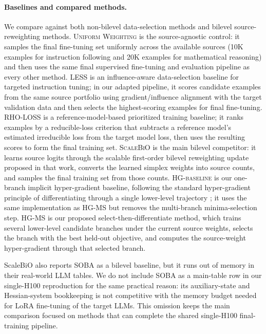 \documentclass{article}
\theoremstyle{normaltheorem}
\begin{document}
\paragraph{Baselines and compared methods.}
We compare against both non-bilevel data-selection methods and bilevel source-reweighting methods. \textsc{Uniform Weighting} is the source-agnostic control: it samples the final fine-tuning set uniformly across the available sources (10K examples for instruction following and 20K examples for mathematical reasoning) and then uses the same final supervised fine-tuning and evaluation pipeline as every other method. \textsc{LESS} \citep{xia2024less} is an influence-aware data-selection baseline for targeted instruction tuning; in our adapted pipeline, it scores candidate examples from the same source portfolio using gradient/influence alignment with the target validation data and then selects the highest-scoring examples for final fine-tuning. \textsc{RHO-LOSS} \citep{mindermann2022prioritized} is a reference-model-based prioritized training baseline; it ranks examples by a reducible-loss criterion that subtracts a reference model's estimated irreducible loss from the target model loss, then uses the resulting scores to form the final training set. \textsc{ScaleBiO} \citep{pan2025scalebio} is the main bilevel competitor: it learns source logits through the scalable first-order bilevel reweighting update proposed in that work, converts the learned simplex weights into source counts, and samples the final training set from those counts. \textsc{HG-baseline} is our one-branch implicit hyper-gradient baseline, following the standard hyper-gradient principle of differentiating through a single lower-level trajectory \citep{lorraine2020optimizing}; it uses the same implementation as \textsc{HG-MS} but removes the multi-branch minima-selection step. \textsc{HG-MS} is our proposed select-then-differentiate method, which trains several lower-level candidate branches under the current source weights, selects the branch with the best held-out objective, and computes the source-weight hyper-gradient through that selected branch.

ScaleBiO also reports SOBA \citep{dagreou2022framework} as a bilevel baseline, but it runs out of memory in their real-world LLM tables. We do not include SOBA as a main-table row in our single-H100 reproduction for the same practical reason: its auxiliary-state and Hessian-system bookkeeping is not competitive with the memory budget needed for LoRA fine-tuning of the target LLMs. This omission keeps the main comparison focused on methods that can complete the shared single-H100 final-training pipeline.
\end{document}
